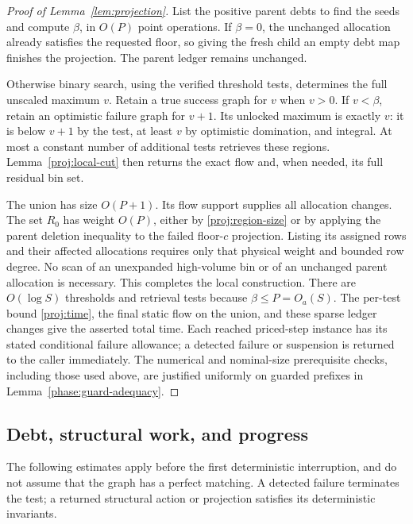 \begin{proof}[Proof of Lemma~\ref{lem:projection}]
List the positive parent debts to find the seeds and compute
\(\beta\), in \(O(P)\) point operations.  If \(\beta=0\), the
unchanged allocation already satisfies the requested floor, so
giving the fresh child an empty debt map finishes the projection.
The parent ledger remains unchanged.

Otherwise binary search, using the verified threshold tests,
determines the full unscaled maximum \(v\).  Retain a true success
graph for \(v\) when \(v>0\).  If \(v<\beta\), retain an optimistic
failure graph for \(v+1\).  Its unlocked maximum is exactly \(v\):
it is below \(v+1\) by the test, at least \(v\) by optimistic
domination, and integral.  At most a constant number of additional
tests retrieves these regions.  Lemma~\ref{proj:local-cut} then
returns the exact flow and, when needed, its full residual bin set.

The union has size \(O(P+1)\).  Its flow support supplies all
allocation changes.  The set \(R_0\) has weight \(O(P)\), either
by \eqref{proj:region-size} or by applying the parent deletion
inequality to the failed floor-\(c\) projection.  Listing its
assigned rows and their affected allocations requires only
that physical weight and bounded row degree.  No scan of an
unexpanded high-volume bin or of an unchanged parent allocation
is necessary.  This completes the local construction.
There are \(O(\log S)\) thresholds and retrieval tests because
\(\beta\le P=O_a(S)\).  The per-test bound \eqref{proj:time},
the final static flow on the union, and these sparse ledger changes
give the asserted total time.  Each reached priced-step instance
has its stated conditional failure allowance; a detected failure
or suspension is returned to the caller immediately.
The numerical and nominal-size prerequisite checks, including
those used above, are justified uniformly on guarded prefixes
in Lemma~\ref{phase:guard-adequacy}.
\end{proof}

\subsection{Debt, structural work, and progress}

The following estimates apply before the first deterministic
interruption, and do not assume that the graph has a perfect
matching.  A detected failure terminates the test; a returned
structural action or projection satisfies its deterministic
invariants.

